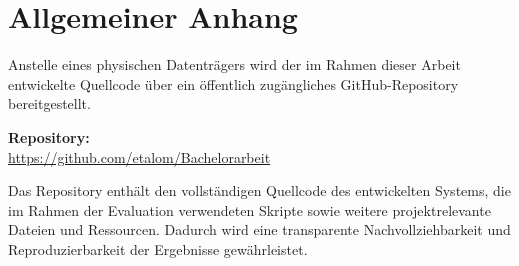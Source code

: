 \clearpage
\section{Allgemeiner Anhang}
\label{Anhang:B Allgemeiner Anhang}

Anstelle eines physischen Datenträgers wird der im Rahmen dieser Arbeit entwickelte Quellcode über ein öffentlich zugängliches GitHub-Repository bereitgestellt.

\medskip

\textbf{Repository:} \\
\url{https://github.com/etalom/Bachelorarbeit}

\medskip

Das Repository enthält den vollständigen Quellcode des entwickelten Systems, die im Rahmen der Evaluation verwendeten Skripte sowie weitere projektrelevante Dateien und Ressourcen. Dadurch wird eine transparente Nachvollziehbarkeit und Reproduzierbarkeit der Ergebnisse gewährleistet.
